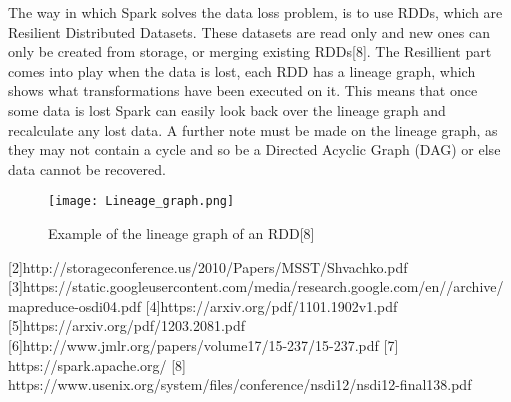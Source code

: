 The way in which Spark solves the data loss problem, is to use RDDs, which are
Resilient Distributed Datasets. These datasets are read only and new ones can
only be created from storage, or merging existing RDDs[8]. The Resillient part comes
into play when the data is lost, each RDD has a lineage graph, which shows what
transformations have been executed on it. This means that once some data is lost
Spark can easily look back over the lineage graph and recalculate any lost data.
A further note must be made on the lineage graph, as they may not contain a cycle
and so be a Directed Acyclic Graph (DAG) or else data cannot be recovered.

\begin{figure}
  \texttt{[image: Lineage\_graph.png]}
  \caption{Example of the lineage graph of an RDD[8]}
  \label{lineagegraph}
\end{figure}








[2]http://storageconference.us/2010/Papers/MSST/Shvachko.pdf %
[3]https://static.googleusercontent.com/media/research.google.com/en//archive/mapreduce-osdi04.pdf %
[4]https://arxiv.org/pdf/1101.1902v1.pdf %
[5]https://arxiv.org/pdf/1203.2081.pdf %
[6]http://www.jmlr.org/papers/volume17/15-237/15-237.pdf %
[7] https://spark.apache.org/ %
[8] https://www.usenix.org/system/files/conference/nsdi12/nsdi12-final138.pdf %

